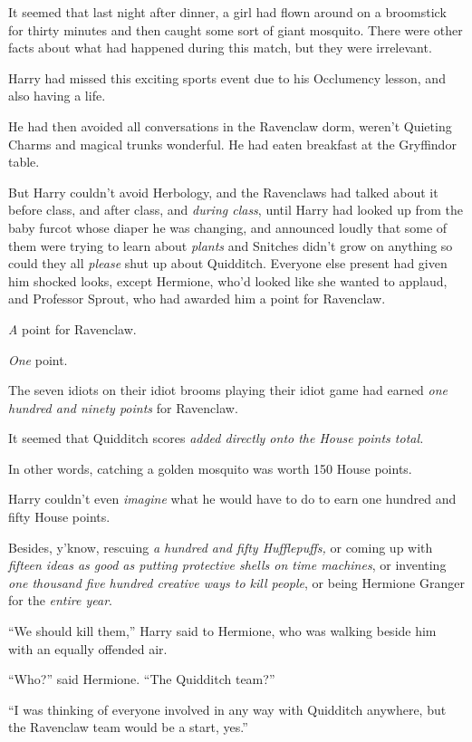 It seemed that last night after dinner, a girl had flown around on a broomstick for thirty minutes and then caught some sort of giant mosquito. There were other facts about what had happened during this match, but they were irrelevant.

Harry had missed this exciting sports event due to his Occlumency lesson, and also having a life.

He had then avoided all conversations in the Ravenclaw dorm, weren’t Quieting Charms and magical trunks wonderful. He had eaten breakfast at the Gryffindor table.

But Harry couldn’t avoid Herbology, and the Ravenclaws had talked about it before class, and after class, and \emph{during class}, until Harry had looked up from the baby furcot whose diaper he was changing, and announced loudly that some of them were trying to learn about \emph{plants} and Snitches didn’t grow on anything so could they all \emph{please} shut up about Quidditch. Everyone else present had given him shocked looks, except Hermione, who’d looked like she wanted to applaud, and Professor Sprout, who had awarded him a point for Ravenclaw.

\emph{A} point for Ravenclaw.

\emph{One} point.

The seven idiots on their idiot brooms playing their idiot game had earned \emph{one hundred and ninety points} for Ravenclaw.

It seemed that Quidditch scores \emph{added directly onto the House points total.}

In other words, catching a golden mosquito was worth 150 House points.

Harry couldn’t even \emph{imagine} what he would have to do to earn one hundred and fifty House points.

Besides, y’know, rescuing \emph{a hundred and fifty Hufflepuffs,} or coming up with \emph{fifteen ideas as good as putting protective shells on time machines}, or inventing \emph{one thousand five hundred creative ways to kill people}, or being Hermione Granger for the \emph{entire year}.

“We should kill them,” Harry said to Hermione, who was walking beside him with an equally offended air.

“Who?” said Hermione. “The Quidditch team?”

“I was thinking of everyone involved in any way with Quidditch anywhere, but the Ravenclaw team would be a start, yes.”

